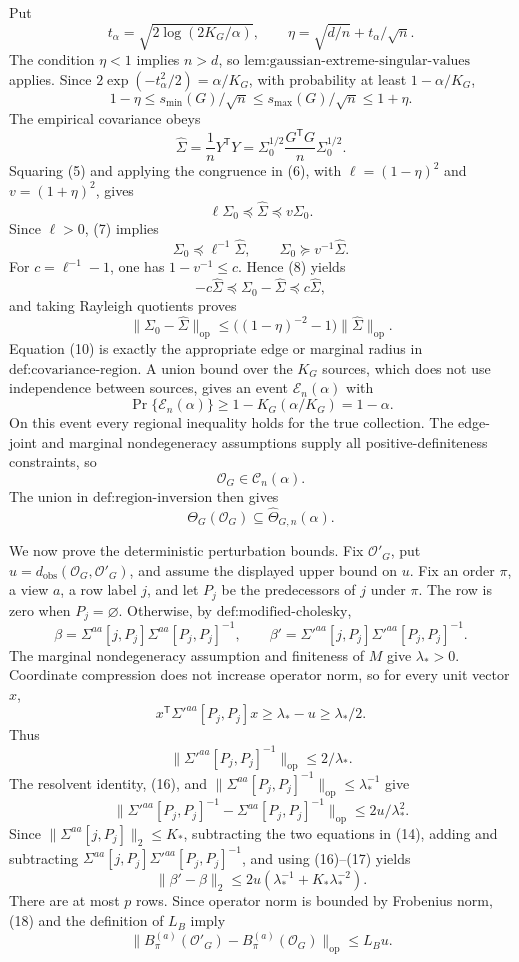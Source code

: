 Put
\[
t_\alpha=\sqrt{2\log(2K_G/\alpha)},
\qquad
\eta=\sqrt{d/n}+t_\alpha/\sqrt n.
\tag{4}
\]
The condition \(\eta<1\) implies \(n>d\), so \(\text{lem:gaussian-extreme-singular-values}\) applies.  Since \(2\exp(-t_\alpha^2/2)=\alpha/K_G\), with probability at least \(1-\alpha/K_G\),
\[
1-\eta\le s_{\min}(G)/\sqrt n
\le s_{\max}(G)/\sqrt n\le1+\eta.
\tag{5}
\]
The empirical covariance obeys
\[
\widehat\Sigma
=\frac1nY^{\mathsf T}Y
=\Sigma_0^{1/2}\frac{G^{\mathsf T}G}{n}\Sigma_0^{1/2}.
\tag{6}
\]
Squaring (5) and applying the congruence in (6), with \(\ell=(1-\eta)^2\) and \(v=(1+\eta)^2\), gives
\[
\ell\Sigma_0\preceq\widehat\Sigma\preceq v\Sigma_0.
\tag{7}
\]
Since \(\ell>0\), (7) implies
\[
\Sigma_0\preceq\ell^{-1}\widehat\Sigma,
\qquad
\Sigma_0\succeq v^{-1}\widehat\Sigma.
\tag{8}
\]
For \(c=\ell^{-1}-1\), one has \(1-v^{-1}\le c\).  Hence (8) yields
\[
-c\widehat\Sigma\preceq\Sigma_0-\widehat\Sigma
\preceq c\widehat\Sigma,
\tag{9}
\]
and taking Rayleigh quotients proves
\[
\|\Sigma_0-\widehat\Sigma\|_{\mathrm{op}}
\le\bigl((1-\eta)^{-2}-1\bigr)\|\widehat\Sigma\|_{\mathrm{op}}.
\tag{10}
\]
Equation (10) is exactly the appropriate edge or marginal radius in \(\text{def:covariance-region}\).  A union bound over the \(K_G\) sources, which does not use independence between sources, gives an event \(\mathcal E_n(\alpha)\) with
\[
\Pr\{\mathcal E_n(\alpha)\}\ge1-K_G(\alpha/K_G)=1-\alpha.
\tag{11}
\]
On this event every regional inequality holds for the true collection.  The edge-joint and marginal nondegeneracy assumptions supply all positive-definiteness constraints, so
\[
\mathcal O_G\in\mathcal C_n(\alpha).
\tag{12}
\]
The union in \(\text{def:region-inversion}\) then gives
\[
\Theta_G(\mathcal O_G)\subseteq\widehat\Theta_{G,n}(\alpha).
\tag{13}
\]

We now prove the deterministic perturbation bounds.  Fix \(\mathcal O'_G\), put \(u=d_{\mathrm{obs}}(\mathcal O_G,\mathcal O'_G)\), and assume the displayed upper bound on \(u\).  Fix an order \(\pi\), a view \(a\), a row label \(j\), and let \(P_j\) be the predecessors of \(j\) under \(\pi\).  The row is zero when \(P_j=\varnothing\).  Otherwise, by \(\text{def:modified-cholesky}\),
\[
\beta=\Sigma^{aa}[j,P_j]\Sigma^{aa}[P_j,P_j]^{-1},
\qquad
\beta'=\Sigma'^{aa}[j,P_j]\Sigma'^{aa}[P_j,P_j]^{-1}.
\tag{14}
\]
The marginal nondegeneracy assumption and finiteness of \(M\) give \(\lambda_*>0\).  Coordinate compression does not increase operator norm, so for every unit vector \(x\),
\[
x^{\mathsf T}\Sigma'^{aa}[P_j,P_j]x
\ge\lambda_*-u\ge\lambda_*/2.
\tag{15}
\]
Thus
\[
\|\Sigma'^{aa}[P_j,P_j]^{-1}\|_{\mathrm{op}}\le2/\lambda_*.
\tag{16}
\]
The resolvent identity, (16), and \(\|\Sigma^{aa}[P_j,P_j]^{-1}\|_{\mathrm{op}}\le\lambda_*^{-1}\) give
\[
\|\Sigma'^{aa}[P_j,P_j]^{-1}-\Sigma^{aa}[P_j,P_j]^{-1}\|_{\mathrm{op}}
\le2u/\lambda_*^2.
\tag{17}
\]
Since \(\|\Sigma^{aa}[j,P_j]\|_2\le K_*\), subtracting the two equations in (14), adding and subtracting \(\Sigma^{aa}[j,P_j]\Sigma'^{aa}[P_j,P_j]^{-1}\), and using (16)--(17) yields
\[
\|\beta'-\beta\|_2
\le2u(\lambda_*^{-1}+K_*\lambda_*^{-2}).
\tag{18}
\]
There are at most \(p\) rows.  Since operator norm is bounded by Frobenius norm, (18) and the definition of \(L_B\) imply
\[
\|B_\pi^{(a)}(\mathcal O'_G)-B_\pi^{(a)}(\mathcal O_G)\|_{\mathrm{op}}
\le L_Bu.
\tag{19}
\]

